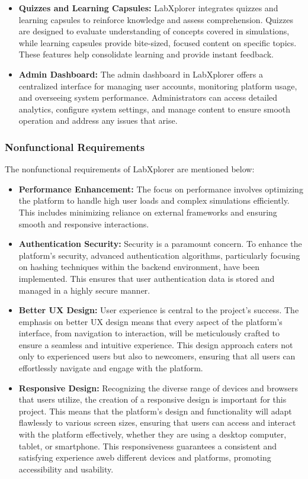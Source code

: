 \begin{itemize}
    \item \textbf{Quizzes and Learning Capsules:} LabXplorer integrates quizzes and learning capsules to reinforce knowledge and assess comprehension. Quizzes are designed to evaluate understanding of concepts covered in simulations, while learning capsules provide bite-sized, focused content on specific topics. These features help consolidate learning and provide instant feedback.

    \item \textbf{Admin Dashboard:} The admin dashboard in LabXplorer offers a centralized interface for managing user accounts, monitoring platform usage, and overseeing system performance. Administrators can access detailed analytics, configure system settings, and manage content to ensure smooth operation and address any issues that arise.
\end{itemize}

\subsubsection{Nonfunctional Requirements}
The nonfunctional requirements of LabXplorer are mentioned below:
\begin{itemize}
    \item \textbf{Performance Enhancement:} The focus on performance involves optimizing the platform to handle high user loads and complex simulations efficiently. This includes minimizing reliance on external frameworks and ensuring smooth and responsive interactions.
    \item \textbf{Authentication Security:} Security is a paramount concern. To enhance the platform’s security, advanced authentication algorithms, particularly focusing on hashing techniques within the backend environment, have been implemented. This ensures that user authentication data is stored and managed in a highly secure manner.
    \item \textbf{Better UX Design:} User experience is central to the project’s success. The emphasis on better UX design means that every aspect of the platform’s interface, from navigation to interaction, will be meticulously crafted to ensure a seamless and intuitive experience. This design approach caters not only to experienced users but also to newcomers, ensuring that all users can effortlessly navigate and engage with the platform.
    \item \textbf{Responsive Design:} Recognizing the diverse range of devices and browsers that users utilize, the creation of a responsive design is important for this project. This means that the platform’s design and functionality will adapt flawlessly to various screen sizes, ensuring that users can access and interact with the platform effectively, whether they are using a desktop computer, tablet, or smartphone. This responsiveness guarantees a consistent and satisfying experience aweb different devices and platforms, promoting accessibility and usability.
\end{itemize}
